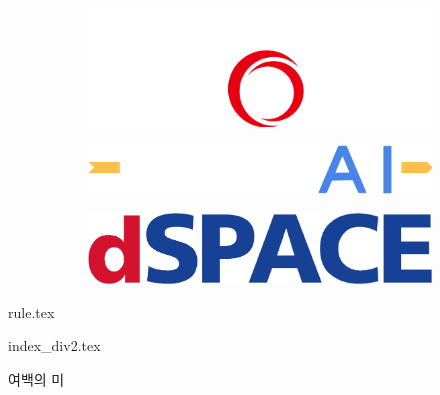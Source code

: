 \begin{figure}[h]
\begin{center}
    \vspace*{0.7cm}
    \begin{subfigure}{0.2\textwidth}
        \centering
        \includegraphics[width=0.9\linewidth]{sponsor/white/mobisw.png}
    \end{subfigure}
    \begin{subfigure}{0.2\textwidth}
        \centering
        \includegraphics[width=0.9\linewidth]{sponsor/white/morai.png}
    \end{subfigure}
    \begin{subfigure}{0.2\textwidth}
        \centering
        \includegraphics[width=0.88\linewidth]{sponsor/dspace.png}
    \end{subfigure}
    
    \end{center}
\end{figure}
\thispagestyle{empty}


\newpage

\nopagecolor

{rule.tex}


{index_div2.tex}

\vspace*{10cm}
\begin{center}
    {\Huge \color{gray} 여백의 미} 
\end{center}

\setlength{\parskip}{0.3\baselineskip}
\setlength{\parindent}{0cm}

